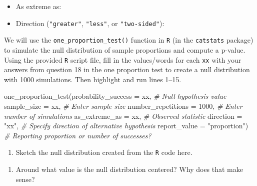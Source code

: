 \documentclass[
]{report}
\newenvironment{Shaded}{\begin{snugshade}}{\end{snugshade}}
\newcommand{\AttributeTok}[1]{\textcolor[rgb]{0.77,0.63,0.00}{#1}}
\newcommand{\CommentTok}[1]{\textcolor[rgb]{0.56,0.35,0.01}{\textit{#1}}}
\newcommand{\DecValTok}[1]{\textcolor[rgb]{0.00,0.00,0.81}{#1}}
\newcommand{\FunctionTok}[1]{\textcolor[rgb]{0.00,0.00,0.00}{#1}}
\newcommand{\NormalTok}[1]{#1}
\newcommand{\StringTok}[1]{\textcolor[rgb]{0.31,0.60,0.02}{#1}}
\providecommand{\tightlist}{%
  \setlength{\itemsep}{0pt}\setlength{\parskip}{0pt}}
\begin{document}
\begin{itemize}
\tightlist
\item
  As extreme as:
\end{itemize}

\vspace{.2in}

\begin{itemize}
\tightlist
\item
  Direction (\texttt{"greater"}, \texttt{"less"}, or \texttt{"two-sided"}):
\end{itemize}

\vspace{.2in}

We will use the \texttt{one\_proportion\_test()} function in \texttt{R} (in the \texttt{catstats} package) to simulate the null distribution of sample proportions and compute a p-value. Using the provided \texttt{R} script file, fill in the values/words for each \texttt{xx} with your answers from question 18 in the one proportion test to create a null distribution with 1000 simulations. Then highlight and run lines 1--15.

\begin{Shaded}
\begin{Highlighting}[]
\FunctionTok{one\_proportion\_test}\NormalTok{(}\AttributeTok{probability\_success =}\NormalTok{ xx, }\CommentTok{\# Null hypothesis value}
          \AttributeTok{sample\_size =}\NormalTok{ xx, }\CommentTok{\# Enter sample size}
          \AttributeTok{number\_repetitions =} \DecValTok{1000}\NormalTok{, }\CommentTok{\# Enter number of simulations}
          \AttributeTok{as\_extreme\_as =}\NormalTok{ xx, }\CommentTok{\# Observed statistic}
          \AttributeTok{direction =} \StringTok{"xx"}\NormalTok{, }\CommentTok{\# Specify direction of alternative hypothesis}
          \AttributeTok{report\_value =} \StringTok{"proportion"}\NormalTok{) }\CommentTok{\# Reporting proportion or number of successes?}
\end{Highlighting}
\end{Shaded}

\begin{enumerate}
\def\labelenumi{\arabic{enumi}.}
\setcounter{enumi}{18}
\tightlist
\item
  Sketch the null distribution created from the \texttt{R} code here.
\end{enumerate}

\vspace{1.8in}

\begin{enumerate}
\def\labelenumi{\arabic{enumi}.}
\setcounter{enumi}{19}
\tightlist
\item
  Around what value is the null distribution centered? Why does that make sense?
\end{enumerate}
\end{document}
